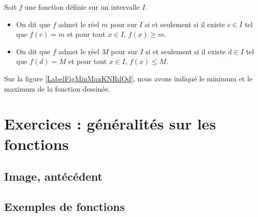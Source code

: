 \begin{definition}
      Soit $f$ une fonction définie sur un intervalle $I$.
      \begin{itemize}
          \item On dit que $f$ admet le réel $m$ pour 
        sur $I$ si et seulement si il existe $c\in I$ tel que $f(c)=m$
        et pour tout $x\in I$, $f(x)\geq m$. 
    \item On dit que $f$ admet le réel $M$ pour 
        sur $I$ si et seulement si il existe $d\in I$ tel que $f(d)=M$ et pour tout
        $x\in I$, $f(x)\leq M$.
      \end{itemize}
\end{definition}

Sur la figure \ref{LabelFigMinMaxKNRdOd}, nous avons indiqué le minimum et le maximum de la fonction dessinée.
\newcommand{\CaptionFigMinMaxKNRdOd}{Minimum et maximum d'une fonction.}



\section{Exercices : généralités sur les fonctions}

\subsection{Image, antécédent}


\subsection{Exemples de fonctions}

